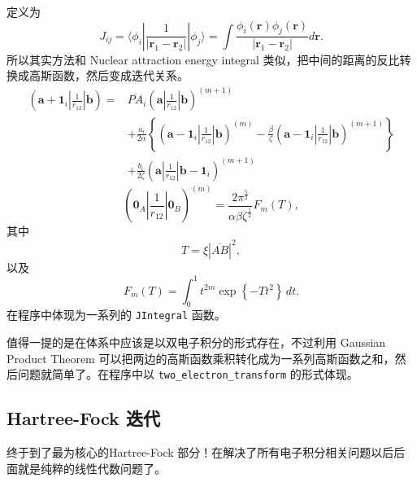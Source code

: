 \documentclass[12pt,a4paper,openany,twoside]{article}
\numberwithin{equation}{section}
\begin{document}
                定义为
                \begin{equation}
                    J_{ij} = \langle \phi_i | \frac{1}{|\boldsymbol{r}_1 - \boldsymbol{r}_2|} |\phi_j \rangle = \int \frac{\phi_i(\boldsymbol{r}) \phi_j(\boldsymbol{r})}{|\boldsymbol{r}_1 - \boldsymbol{r}_2|} d \boldsymbol{r}. 
                \end{equation}
                所以其实方法和 Nuclear attraction energy integral 类似，把中间的距离的反比转换成高斯函数，然后变成迭代关系。
                \begin{equation}
                    \begin{aligned}
                    ( \boldsymbol{a} + \boldsymbol{1}_i | \frac{1}{r_{12}} | \boldsymbol{b} ) =  & \overline{PA}_i ( \boldsymbol{a} | \frac{1}{r_{12}} | \boldsymbol{b} ) ^{(m+1)} \\
                    & + \frac{a_i}{2\alpha} \left\{ ( \boldsymbol{a}-\boldsymbol{1}_i | \frac{1}{r_{12}} | \boldsymbol{b} ) ^{(m)} - \frac{\beta}{\zeta}( \boldsymbol{a} - \boldsymbol{1}_i | \frac{1}{r_{12}} | \boldsymbol{b} ) ^{(m+1)}\right\}\\
                    & + \frac{b_i}{2\zeta} ( \boldsymbol{a} | \frac{1}{r_{12}} | \boldsymbol{b} - \boldsymbol{1}_i ) ^{(m+1)} 
                    \end{aligned}
                \end{equation}
                \begin{equation}
                    ( \boldsymbol{0}_A | \frac{1}{r_{12}} | \boldsymbol{0}_B ) ^{(m)} = \frac{2\pi ^{\frac{5}{2}}}{\alpha \beta \zeta^\frac{1}{2}} F_m(T)
                ,\end{equation}
                其中
                \begin{equation}
                    T = \xi |\overline{AB}| ^2
                ,\end{equation}
                以及
                \begin{equation}
                    F_m (T) = \int ^1_0 t^{2m} \exp \left\{ - T t^2 \right\}  \, dt 
                .\end{equation}
                在程序中体现为一系列的 \lstinline$JIntegral$ 函数。

                值得一提的是在体系中应该是以双电子积分的形式存在，不过利用 Gaussian Product Theorem 可以把两边的高斯函数乘积转化成为一系列高斯函数之和，然后问题就简单了。在程序中以 \lstinline$two_electron_transform$ 的形式体现。


            \subsection{Hartree-Fock 迭代}
            终于到了最为核心的Hartree-Fock 部分！在解决了所有电子积分相关问题以后后面就是纯粹的线性代数问题了。
\end{document}
